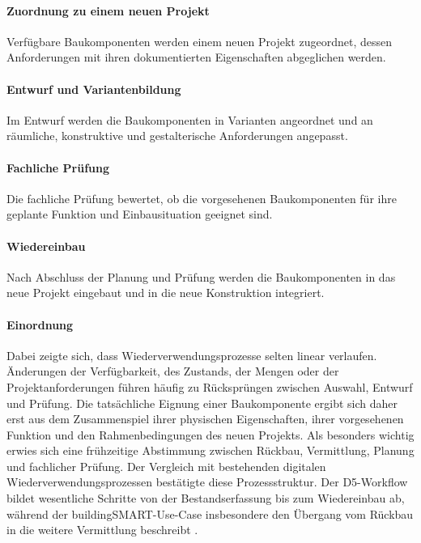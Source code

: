 \documentclass[type=zwischenbericht]{zukunftbau}
\begin{document}
\begin{SemioNest}
\begin{SemioNest}
\paragraph{Zuordnung zu einem neuen Projekt}
Verfügbare Baukomponenten werden einem neuen Projekt zugeordnet, dessen Anforderungen mit ihren dokumentierten Eigenschaften abgeglichen werden.

\paragraph{Entwurf und Variantenbildung}
Im Entwurf werden die Baukomponenten in Varianten angeordnet und an räumliche, konstruktive und gestalterische Anforderungen angepasst.

\paragraph{Fachliche Prüfung}
Die fachliche Prüfung bewertet, ob die vorgesehenen Baukomponenten für ihre geplante Funktion und Einbausituation geeignet sind.

\paragraph{Wiedereinbau}
Nach Abschluss der Planung und Prüfung werden die Baukomponenten in das neue Projekt eingebaut und in die neue Konstruktion integriert.

\paragraph{Einordnung}
Dabei zeigte sich, dass Wiederverwendungsprozesse selten linear verlaufen. Änderungen der Verfügbarkeit, des Zustands, der Mengen oder der Projektanforderungen führen häufig zu Rücksprüngen zwischen Auswahl, Entwurf und Prüfung. Die tatsächliche Eignung einer Baukomponente ergibt sich daher erst aus dem Zusammenspiel ihrer physischen Eigenschaften, ihrer vorgesehenen Funktion und den Rahmenbedingungen des neuen Projekts. Als besonders wichtig erwies sich eine frühzeitige Abstimmung zwischen Rückbau, Vermittlung, Planung und fachlicher Prüfung. Der Vergleich mit bestehenden digitalen Wiederverwendungsprozessen bestätigte diese Prozessstruktur. Der D5-Workflow bildet wesentliche Schritte von der Bestandserfassung bis zum Wiedereinbau ab, während der buildingSMART-Use-Case insbesondere den Übergang vom Rückbau in die weitere Vermittlung beschreibt \cite{de-wolf-d5-digital-circular-workflow-2024,buildingsmart-benelux-decommissioning-to-reuse-2024}.


\end{SemioNest}
\end{SemioNest}
\end{document}
